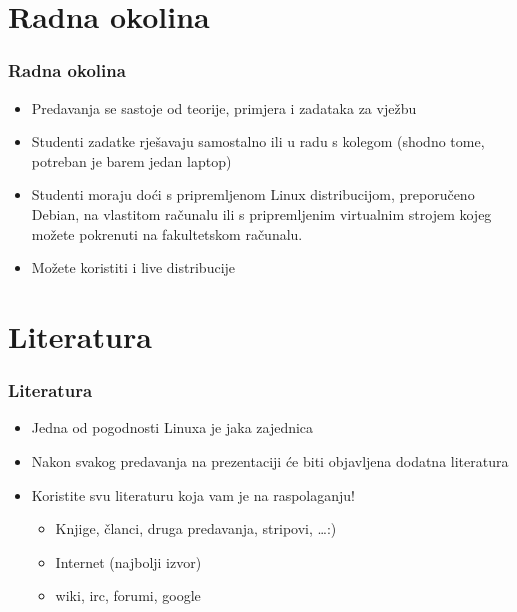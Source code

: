 \documentclass{beamer}
\begin{document}
\section{Radna okolina}
\begin{frame}[t]
\frametitle{Radna okolina}
\begin{itemize}
	\item Predavanja se sastoje od teorije, primjera i zadataka za vježbu
	\item Studenti zadatke rješavaju samostalno ili u radu s kolegom (shodno tome, potreban je barem jedan laptop)
	\item Studenti moraju doći s pripremljenom Linux distribucijom, preporučeno Debian, na vlastitom računalu ili s pripremljenim virtualnim strojem kojeg možete pokrenuti na fakultetskom računalu.
	\item Možete koristiti i live distribucije
\end{itemize}
\end{frame}

\section{Literatura}
\begin{frame}[t]
\frametitle{Literatura}
\begin{itemize}
	\item Jedna od pogodnosti Linuxa je jaka zajednica
	\item Nakon svakog predavanja na prezentaciji će biti objavljena dodatna literatura
	\item Koristite svu literaturu koja vam je na raspolaganju!
	\begin{itemize}
		\item Knjige, članci, druga predavanja, stripovi, \ldots :)
		\item Internet (najbolji izvor)
		\item wiki, irc, forumi, google 
	\end{itemize}
\end{itemize}
\end{frame}
\end{document}
